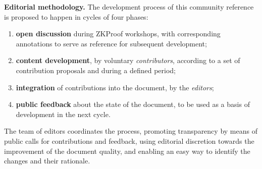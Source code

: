 \textbf{Editorial methodology.}
	The development process of this community reference is proposed to happen in cycles of four phases:
	\begin{enumerate}[label=(\roman*),itemsep=0ex]
	\item \textbf{open discussion} during ZKProof workshops, with corresponding annotations to serve as reference for subsequent development;
	\item \textbf{content development}, by voluntary \emph{contributors}, according to a set of contribution proposals and during a defined period;
	\item \textbf{integration} of contributions into the document, by the \emph{editors}; 
	\item \textbf{public feedback} about the state of the document, to be used as a basis of development in the next cycle.
	\end{enumerate}
	The team of editors coordinates the process, 
promoting transparency by means of public calls for contributions and feedback, 
using editorial discretion towards the improvement of the document quality,
and enabling an easy way to identify the changes and their rationale.
